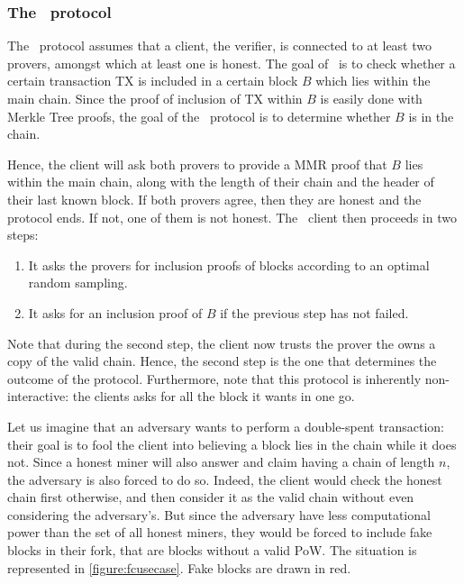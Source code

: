 \documentclass[11pt]{report}
\begin{document}
                \subsubsection{The \FC\ protocol}
                    The \FC\ protocol assumes that a client, the verifier, is connected to at least two provers, amongst which at least one is honest. The goal of \FC\ is to check whether a certain transaction TX is included in a certain block \(B\) which lies within the main chain. Since the proof of inclusion of TX within \(B\) is easily done with Merkle Tree proofs, the goal of the \FC\ protocol is to determine whether \(B\) is in the chain.
                    
                    Hence, the client will ask both provers to provide a MMR proof that \(B\) lies within the main chain, along with the length of their chain and the header of their last known block. If both provers agree, then they are honest and the protocol ends. If not, one of them is not honest. The \FC\ client then proceeds in two steps:
                    
                    \begin{enumerate}
                        \item It asks the provers for inclusion proofs of blocks according to an optimal random sampling.
                        \item It asks for an inclusion proof of \(B\) if the previous step has not failed.
                    \end{enumerate}
                    
                    Note that during the second step, the client now trusts the prover the owns a copy of the valid chain. Hence, the second step is the one that determines the outcome of the protocol. Furthermore, note that this protocol is inherently non-interactive: the clients asks for all the block it wants in one go.
                    
                    Let us imagine that an adversary wants to perform a double-spent transaction: their goal is to fool the client into believing a block lies in the chain while it does not. Since a honest miner will also answer and claim having a chain of length \(n\), the adversary is also forced to do so. Indeed, the client would check the honest chain first otherwise, and then consider it as the valid chain without even considering the adversary's. But since the adversary have less computational power than the set of all honest miners, they would be forced to include fake blocks in their fork, that are blocks without a valid PoW. The situation  is represented in \autoref{figure:fcusecase}. Fake blocks are drawn in red.
                    
\end{document}
